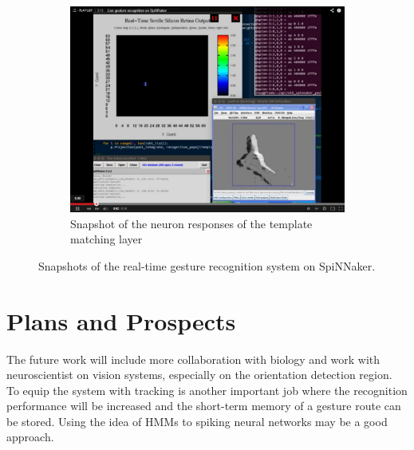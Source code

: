 \documentclass[journal]{journal}
\begin{document}
\begin{figure}
	\begin{subfigure}[t]{0.42\textwidth}
		\includegraphics[width=\textwidth]{pics/live.png}
		\caption{Snapshot of the neuron responses of the template matching layer}
	    \label{fig:live3}
	\end{subfigure}	

\caption{Snapshots of the real-time gesture recognition system on SpiNNaker.
}
\label{fig:live}
\end{figure}
  

\section{Plans and Prospects}
The future work will include more collaboration with biology and work with neuroscientist on vision systems, especially on the orientation detection region. 
To equip the system with tracking is another important job where the recognition performance will be increased and the short-term memory of a gesture route can be stored. Using the idea of HMMs to spiking neural networks may be a good approach. 

\end{document}
